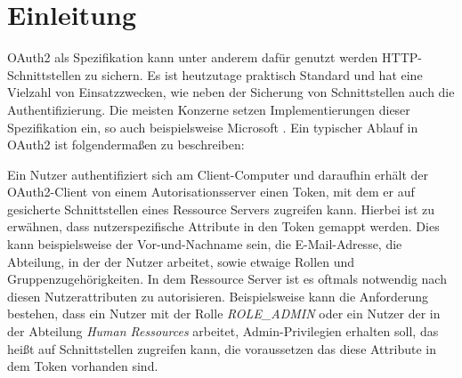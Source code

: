 \chapter{Einleitung}
\label{ch:intro}
OAuth2 als Spezifikation kann unter anderem dafür genutzt werden \linebreak \ac{HTTP}-Schnittstellen zu sichern. Es ist heutzutage praktisch Standard und hat eine Vielzahl von Einsatzzwecken, wie neben der Sicherung von Schnittstellen auch die Authentifizierung. Die meisten Konzerne setzen Implementierungen dieser Spezifikation ein, so auch beispielsweise Microsoft \citep{microsoftoauth2:2021:07}. Ein typischer Ablauf in OAuth2 ist folgendermaßen zu beschreiben:\smallskip

Ein Nutzer authentifiziert sich am Client-Computer und daraufhin erhält der OAuth2-Client von einem Autorisationsserver einen Token, mit dem er auf gesicherte Schnittstellen eines Ressource Servers zugreifen kann. Hierbei ist zu erwähnen, dass nutzerspezifische Attribute in den Token gemappt werden. Dies kann beispielsweise der Vor-und-Nachname sein, die E-Mail-Adresse, die Abteilung, in der der Nutzer arbeitet, sowie etwaige Rollen und Gruppenzugehörigkeiten. In dem Ressource Server ist es oftmals notwendig nach diesen Nutzerattributen zu autorisieren. Beispielsweise kann die Anforderung bestehen, dass ein Nutzer mit der Rolle \emph{ROLE\_ADMIN} oder ein Nutzer der in der Abteilung \emph{Human Ressources} arbeitet, Admin-Privilegien erhalten soll, das heißt auf Schnittstellen zugreifen kann, die voraussetzen das diese Attribute in dem Token vorhanden sind.\smallskip

